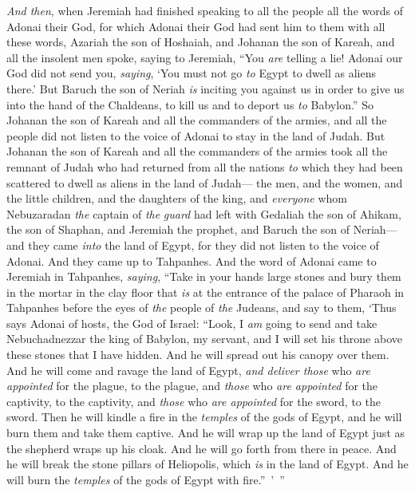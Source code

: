 \begin{biblechapter} %
\verse \textit{And then}, when Jeremiah had finished speaking to all the people all the words of Adonai their God, for which Adonai their God had sent him to them with all these words,
\verse Azariah the son of Hoshaiah, and Johanan the son of Kareah, and all the insolent men spoke, saying to Jeremiah, “You \textit{are} telling a lie! Adonai our God did not send you, \textit{saying}, ‘You must not go \textit{to} Egypt to dwell as aliens there.’
\verse But Baruch the son of Neriah \textit{is} inciting you against us in order to give us into the hand of the Chaldeans, to kill us and to deport us \textit{to} Babylon.”
\verse So Johanan the son of Kareah and all the commanders of the armies, and all the people did not listen to the voice of Adonai to stay in the land of Judah.
\verse But Johanan the son of Kareah and all the commanders of the armies took all the remnant of Judah who had returned from all the nations \textit{to} which they had been scattered to dwell as aliens in the land of Judah—
\verse the men, and the women, and the little children, and the daughters of the king, and \textit{everyone} whom Nebuzaradan \textit{the} captain of \textit{the} \textit{guard} had left with Gedaliah the son of Ahikam, the son of Shaphan, and Jeremiah the prophet, and Baruch the son of Neriah—
\verse and they came \textit{into} the land of Egypt, for they did not listen to the voice of Adonai. And they came up to Tahpanhes.
 And the word of Adonai came to Jeremiah in Tahpanhes, \textit{saying},
\verse “Take in your hands large stones and bury them in the mortar in the clay floor that \textit{is} at the entrance of the palace of Pharaoh in Tahpanhes before the eyes of \textit{the} people of \textit{the} Judeans,
\verse and say to them, ‘Thus says Adonai of hosts, the God of Israel: “Look, I \textit{am} going to send and take Nebuchadnezzar the king of Babylon, my servant, and I will set his throne above these stones that I have hidden. And he will spread out his canopy over them.
\verse And he will come and ravage the land of Egypt, \textit{and deliver those} who \textit{are appointed} for the plague, to the plague, and \textit{those} who \textit{are appointed} for the captivity, to the captivity, and \textit{those} who \textit{are appointed} for the sword, to the sword.
\verse Then he will kindle a fire in the \textit{temples} of the gods of Egypt, and he will burn them and take them captive. And he will wrap up the land of Egypt just as the shepherd wraps up his cloak. And he will go forth from there in peace.
\verse And he will break the stone pillars of Heliopolis, which \textit{is} in the land of Egypt. And he will burn the \textit{temples} of the gods of Egypt with fire.” ’ ”
\end{biblechapter}

